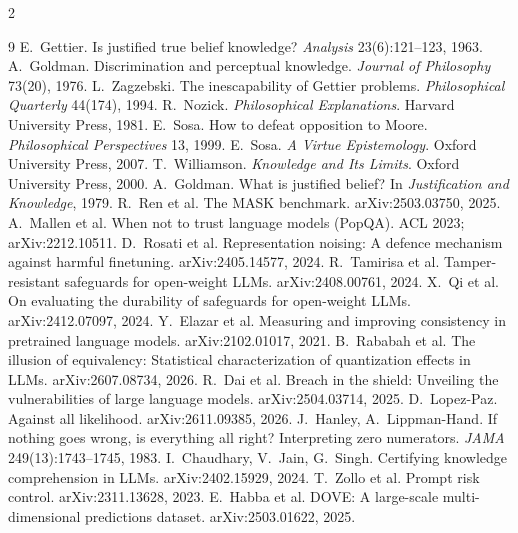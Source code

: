 \documentclass[10pt]{article}
\begin{document}
\vspace{-0.6em}
{\scriptsize
\renewcommand{\refname}{\normalsize References}
\begin{multicols}{2}\begin{thebibliography}{9}\setlength{\itemsep}{0pt}
 E.~Gettier. Is justified true belief knowledge? \textit{Analysis} 23(6):121--123, 1963.
 A.~Goldman. Discrimination and perceptual knowledge. \textit{Journal of Philosophy} 73(20), 1976.
 L.~Zagzebski. The inescapability of Gettier problems. \textit{Philosophical Quarterly} 44(174), 1994.
 R.~Nozick. \textit{Philosophical Explanations}. Harvard University Press, 1981.
 E.~Sosa. How to defeat opposition to Moore. \textit{Philosophical Perspectives} 13, 1999.
 E.~Sosa. \textit{A Virtue Epistemology}. Oxford University Press, 2007.
 T.~Williamson. \textit{Knowledge and Its Limits}. Oxford University Press, 2000.
 A.~Goldman. What is justified belief? In \textit{Justification and Knowledge}, 1979.
 R.~Ren et al. The MASK benchmark. arXiv:2503.03750, 2025.
 A.~Mallen et al. When not to trust language models (PopQA). ACL 2023; arXiv:2212.10511.
 D.~Rosati et al. Representation noising: A defence mechanism against harmful finetuning. arXiv:2405.14577, 2024.
 R.~Tamirisa et al. Tamper-resistant safeguards for open-weight LLMs. arXiv:2408.00761, 2024.
 X.~Qi et al. On evaluating the durability of safeguards for open-weight LLMs. arXiv:2412.07097, 2024.
 Y.~Elazar et al. Measuring and improving consistency in pretrained language models. arXiv:2102.01017, 2021.
 B.~Rababah et al. The illusion of equivalency: Statistical characterization of quantization effects in LLMs. arXiv:2607.08734, 2026.
 R.~Dai et al. Breach in the shield: Unveiling the vulnerabilities of large language models. arXiv:2504.03714, 2025.
 D.~Lopez-Paz. Against all likelihood. arXiv:2611.09385, 2026.
 J.~Hanley, A.~Lippman-Hand. If nothing goes wrong, is everything all right? Interpreting zero numerators. \textit{JAMA} 249(13):1743--1745, 1983.
 I.~Chaudhary, V.~Jain, G.~Singh. Certifying knowledge comprehension in LLMs. arXiv:2402.15929, 2024.
 T.~Zollo et al. Prompt risk control. arXiv:2311.13628, 2023.
 E.~Habba et al. DOVE: A large-scale multi-dimensional predictions dataset. arXiv:2503.01622, 2025.

\end{thebibliography}
\end{multicols}}
\end{document}
